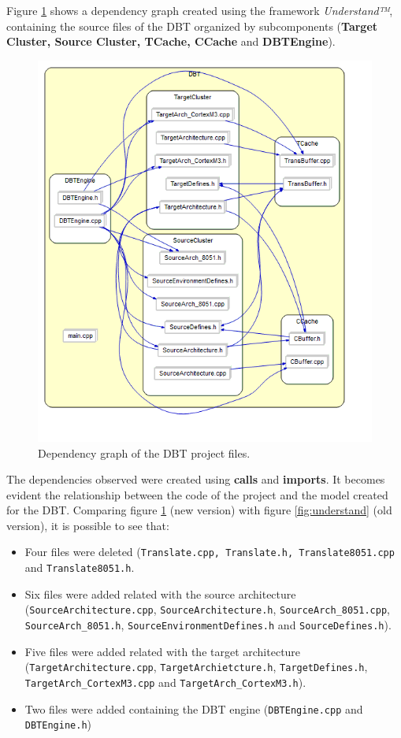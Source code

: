 Figure \ref{fig:refactorunderstand} shows a dependency graph created using the framework \textit{Understand™}, containing the source files of the DBT organized by subcomponents (\textbf{Target Cluster, Source Cluster, TCache, CCache} and \textbf{DBTEngine}).
 
\begin{figure}[!htb]
\centerline{
\includegraphics[scale=0.7]{images/DBT_understand}
}
\caption{Dependency graph of the DBT project files.}
\label{fig:refactorunderstand} 
\end{figure}

The dependencies observed were created using \textbf{calls} and \textbf{imports}. It becomes evident the relationship between the code of the project and the model created for the DBT. Comparing figure \ref{fig:refactorunderstand} (new version) with figure \ref{fig:understand} (old version), it is possible to see that:
\begin{itemize}
\item Four files were deleted (\texttt{Translate.cpp, Translate.h, Translate8051.cpp} and \texttt{Translate8051.h}.
\item Six files were added related with the source architecture (\texttt{SourceArchitecture.cpp}, \texttt{SourceArchitecture.h}, \texttt{SourceArch\_8051.cpp}, \texttt{SourceArch\_8051.h}, \texttt{SourceEnvironmentDefines.h} and \texttt{SourceDefines.h}).
\item Five files were added related with the target architecture (\texttt{TargetArchitecture.cpp}, \texttt{TargetArchietcture.h}, \texttt{TargetDefines.h}, \texttt{TargetArch\_CortexM3.cpp} and \texttt{TargetArch\_CortexM3.h}).
\item Two files were added containing the DBT engine (\texttt{DBTEngine.cpp} and \texttt{DBTEngine.h})
\end{itemize}

